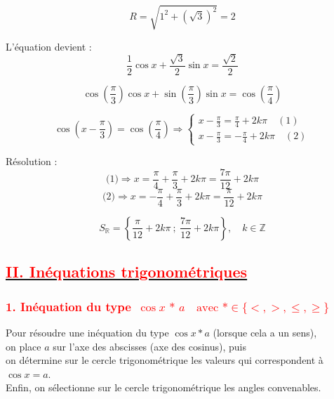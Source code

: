 \documentclass[a4paper,12pt]{article}
\begin{document}
            \[
                R = \sqrt{1^2 + (\sqrt{3})^2} = 2
            \]

            \noindent
            L'équation devient :
            \[
                \frac{1}{2} \cos x + \frac{\sqrt{3}}{2} \sin x = \frac{\sqrt{2}}{2}
            \]

            \[
                \cos\left(\frac{\pi}{3}\right)\cos x + \sin\left(\frac{\pi}{3}\right)\sin x = \cos\left(\frac{\pi}{4}\right)
            \]

            \[
                \cos\left(x - \frac{\pi}{3} \right) = \cos\left( \frac{\pi}{4} \right)
                \Rightarrow
                \begin{cases}
                    x - \frac{\pi}{3} = \frac{\pi}{4} + 2k\pi \quad (1) \\
                    x - \frac{\pi}{3} = -\frac{\pi}{4} + 2k\pi \quad (2)
                \end{cases}
            \]

            \noindent
            Résolution :
            \[
                \text{(1)} \Rightarrow x = \frac{\pi}{4} + \frac{\pi}{3} + 2k\pi = \frac{7\pi}{12} + 2k\pi
            \]
            \[
                \text{(2)} \Rightarrow x = -\frac{\pi}{4} + \frac{\pi}{3} + 2k\pi = \frac{\pi}{12} + 2k\pi
            \]

            \[
                \boxed{S_\mathbb{R} = \left\{ \frac{\pi}{12} + 2k\pi \ ;\ \frac{7\pi}{12} + 2k\pi \right\},\quad k \in \mathbb{Z}}
            \]

            \subsection*{\underline{\textcolor{red}{II. Inéquations trigonométriques}}}

            \subsubsection*{\textcolor{red}{1. Inéquation du type $\, \cos x \,\ast\, a \quad \text{avec } \ast \in \{<, >, \leq, \geq\}$}}

            \noindent
            Pour résoudre une inéquation du type $\cos x \ast a$ (lorsque cela a un sens),\\
            on place $a$ sur l'axe des abscisses (axe des cosinus), puis\\
            on détermine sur le cercle trigonométrique les valeurs qui correspondent à $\cos x = a$.\\
            Enfin, on sélectionne sur le cercle trigonométrique les angles convenables.\\
\end{document}
